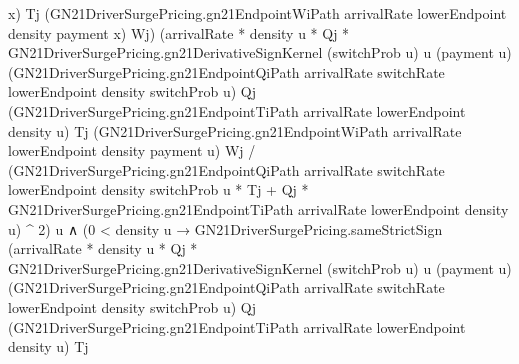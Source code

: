 \documentclass[10pt]{article}
\begin{document}
\begin{ReviewVerbatim}
                                              x)
                                            Tj
                                            (GN21DriverSurgePricing.gn21EndpointWiPath arrivalRate lowerEndpoint density
                                              payment x)
                                            Wj)
                                        (arrivalRate * density u * Qj *
                                            GN21DriverSurgePricing.gn21DerivativeSignKernel (switchProb u) u (payment u)
                                              (GN21DriverSurgePricing.gn21EndpointQiPath arrivalRate switchRate
                                                lowerEndpoint density switchProb u)
                                              Qj
                                              (GN21DriverSurgePricing.gn21EndpointTiPath arrivalRate lowerEndpoint
                                                density u)
                                              Tj
                                              (GN21DriverSurgePricing.gn21EndpointWiPath arrivalRate lowerEndpoint
                                                density payment u)
                                              Wj /
                                          (GN21DriverSurgePricing.gn21EndpointQiPath arrivalRate switchRate
                                                  lowerEndpoint density switchProb u *
                                                Tj +
                                              Qj *
                                                GN21DriverSurgePricing.gn21EndpointTiPath arrivalRate lowerEndpoint
                                                  density u) ^
                                            2)
                                        u ∧
                                      (0 < density u →
                                        GN21DriverSurgePricing.sameStrictSign
                                          (arrivalRate * density u * Qj *
                                              GN21DriverSurgePricing.gn21DerivativeSignKernel (switchProb u) u
                                                (payment u)
                                                (GN21DriverSurgePricing.gn21EndpointQiPath arrivalRate switchRate
                                                  lowerEndpoint density switchProb u)
                                                Qj
                                                (GN21DriverSurgePricing.gn21EndpointTiPath arrivalRate lowerEndpoint
                                                  density u)
                                                Tj

\end{ReviewVerbatim}
\end{document}
